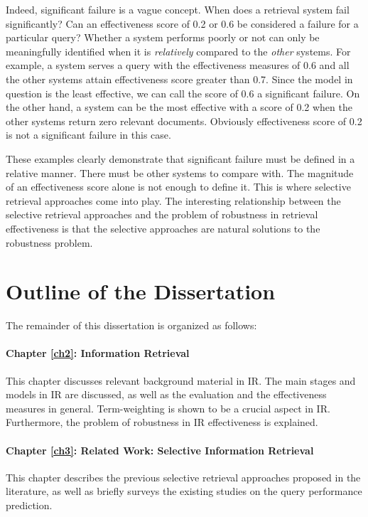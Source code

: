 Indeed, significant failure is a vague concept. 
When does a retrieval system fail significantly? 
Can an effectiveness score of 0.2 or 0.6 be considered a failure for a particular query?
Whether a system performs poorly or not can only be meaningfully identified when it is \emph{relatively} compared to the \emph{other} systems.
For example, a system serves a query with the effectiveness measures of 0.6 and all the other systems attain effectiveness score greater than 0.7. 
Since the model in question is the least effective, we can call the score of 0.6 a significant failure.
On the other hand, a system can be the most effective with a score of 0.2 when the other systems return zero relevant documents.
Obviously effectiveness score of 0.2 is not a significant failure in this case.

These examples clearly demonstrate that significant failure must be defined in a relative manner.
There must be other systems to compare with. 
The magnitude of an effectiveness score alone is not enough to define it. 
This is where selective retrieval approaches come into play.
The interesting relationship between the selective retrieval approaches and the problem of robustness in retrieval effectiveness is that the selective approaches are natural solutions to the robustness problem.


\section{Outline of the Dissertation}
The remainder of this dissertation is organized as follows:

\paragraph{Chapter \ref{ch2}: Information Retrieval}
This chapter discusses relevant background material in IR. The main stages and models in IR are discussed, as well as the evaluation and the effectiveness measures in general. 
Term-weighting is shown to be a crucial aspect in IR.
Furthermore, the problem of robustness in IR effectiveness is explained.

\paragraph{Chapter \ref{ch3}: Related Work: Selective Information Retrieval}
This chapter describes the previous selective retrieval approaches proposed in the literature, as well as briefly surveys the existing studies on the query performance prediction.

